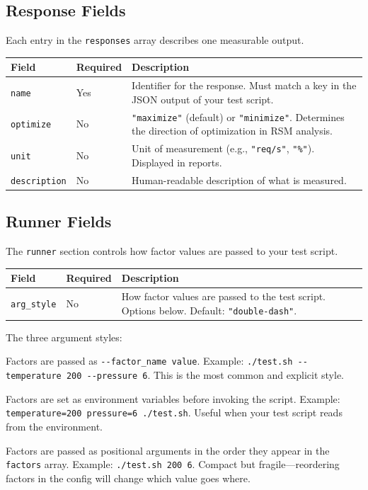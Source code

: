 \documentclass[11pt]{book}
\begin{document}
\subsection{Response Fields}

Each entry in the \texttt{responses} array describes one measurable output.

\begin{center}
\begin{tabular}{llp{5.5cm}}
\toprule
Field & Required & Description \\
\midrule
\texttt{name} & Yes & Identifier for the response. Must match a key in the JSON output of your test script. \\
\texttt{optimize} & No & \texttt{"maximize"} (default) or \texttt{"minimize"}. Determines the direction of optimization in RSM analysis. \\
\texttt{unit} & No & Unit of measurement (e.g., \texttt{"req/s"}, \texttt{"\%"}). Displayed in reports. \\
\texttt{description} & No & Human-readable description of what is measured. \\
\bottomrule
\end{tabular}
\end{center}

\subsection{Runner Fields}

The \texttt{runner} section controls how factor values are passed to your test script.

\begin{center}
\begin{tabular}{llp{5.5cm}}
\toprule
Field & Required & Description \\
\midrule
\texttt{arg\_style} & No & How factor values are passed to the test script. Options below. Default: \texttt{"double-dash"}. \\
\bottomrule
\end{tabular}
\end{center}

\noindent The three argument styles:

\begin{description}[style=nextline, leftmargin=2.5cm]
\item[\texttt{double-dash}] Factors are passed as \texttt{-{}-factor\_name value}.
      Example: \texttt{./test.sh -{}-temperature 200 -{}-pressure 6}. This is the
      most common and explicit style.
\item[\texttt{env}] Factors are set as environment variables before invoking the
      script. Example: \texttt{temperature=200 pressure=6 ./test.sh}. Useful when
      your test script reads from the environment.
\item[\texttt{positional}] Factors are passed as positional arguments in the order
      they appear in the \texttt{factors} array. Example:
      \texttt{./test.sh 200 6}. Compact but fragile---reordering factors in the
      config will change which value goes where.
\end{description}
\end{document}
